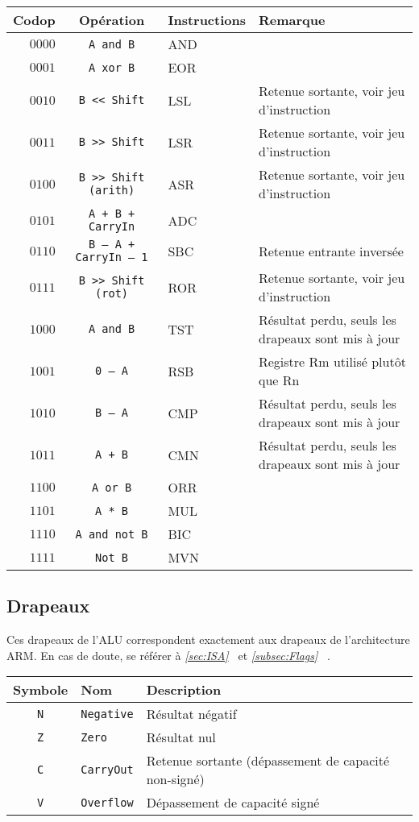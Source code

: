 \begin{tabular}{|r|c|l|l|}
\hline
\textbf{Codop}  & \textbf{Opération}	& \textbf{Instructions} & \textbf{Remarque}\\
\hline

$0000$ & \texttt{A and B}			& AND			&\\
\hline
$0001$ & \texttt{A xor B}			& EOR			&\\
\hline
$0010$ & \texttt{B << Shift}			& LSL			& Retenue sortante, voir jeu d'instruction\\
\hline
$0011$ & \texttt{B >> Shift}			& LSR			& Retenue sortante, voir jeu d'instruction\\
\hline
$0100$ & \texttt{B >> Shift (arith)}		& ASR			& Retenue sortante, voir jeu d'instruction\\
\hline
$0101$ & \texttt{A + B + CarryIn}		& ADC			&\\
\hline
$0110$ & \texttt{B – A + CarryIn – 1}		& SBC			& Retenue entrante inversée\\
\hline
$0111$ & \texttt{B >> Shift (rot)}		& ROR			& Retenue sortante, voir jeu d'instruction\\
\hline
$1000$ & \texttt{A and B}			& TST			& Résultat perdu, seuls les drapeaux sont mis à jour\\
\hline
$1001$ & \texttt{0 – A}				& RSB			& Registre Rm utilisé plutôt que Rn\\
\hline
$1010$ & \texttt{B – A}				& CMP			& Résultat perdu, seuls les drapeaux sont mis à jour\\
\hline
$1011$ & \texttt{A + B}				& CMN			& Résultat perdu, seuls les drapeaux sont mis à jour\\
\hline
$1100$ & \texttt{A or B}			& ORR			&\\
\hline
$1101$ & \texttt{A * B}				& MUL			&\\
\hline
$1110$ & \texttt{A and not B}			& BIC			&\\
\hline
$1111$ & \texttt{Not B}				& MVN			&\\
\hline
\end{tabular}

\subsection{Drapeaux}

Ces drapeaux de l'ALU correspondent exactement aux drapeaux de l'architecture ARM. En cas de doute, se référer à \textit{\ref{sec:ISA}~} et \textit{\ref{subsec:Flags}~} .

\begin{tabular}{|c|l|l|}
\hline
\textbf{Symbole} & \textbf{Nom} & \textbf{Description}\\
\hline

\texttt{N}	& \texttt{Negative}	& Résultat négatif\\
\hline
\texttt{Z}	& \texttt{Zero}		& Résultat nul\\
\hline
\texttt{C}	& \texttt{CarryOut}	& Retenue sortante (dépassement de capacité non-signé)\\
\hline
\texttt{V}	&  \texttt{Overflow}	& Dépassement de capacité signé\\

\hline
\end{tabular}
